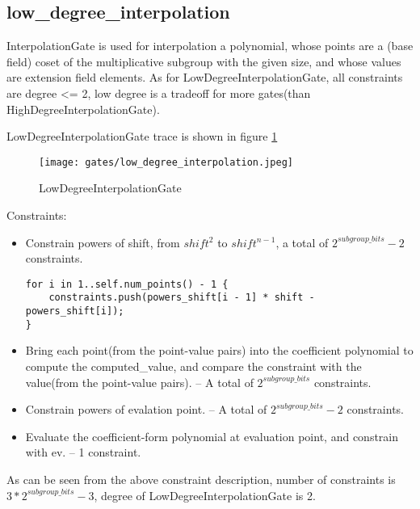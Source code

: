 \subsection{low\_degree\_interpolation}

InterpolationGate is used for interpolation a polynomial, whose points are a (base field) coset of the multiplicative subgroup 
with the given size, and whose values are extension field elements. As for LowDegreeInterpolationGate,  all constraints are degree <= 2, 
low degree is a tradeoff for more gates(than HighDegreeInterpolationGate).

LowDegreeInterpolationGate trace is shown in figure \ref{fig:low-degree-interpolation}

\begin{figure}[!ht]
    \centering
    \texttt{[image: gates/low\_degree\_interpolation.jpeg]}
    \caption{LowDegreeInterpolationGate}
    \label{fig:low-degree-interpolation}
\end{figure}

Constraints:
\begin{itemize}
    \item Constrain powers of shift, from $shift^2$ to $shift^{n-1}$, a total of $2^{subgroup\_bits}-2$ constraints.
    \begin{lstlisting}
for i in 1..self.num_points() - 1 {
    constraints.push(powers_shift[i - 1] * shift - powers_shift[i]);
}
    \end{lstlisting}
    \item Bring each point(from the point-value pairs) into the coefficient polynomial to compute the computed\_value, 
    and compare the constraint with the value(from the point-value pairs). -- A total of $2^{subgroup\_bits}$ constraints.
    \item Constrain powers of evalation point. -- A total of $2^{subgroup\_bits}-2$ constraints.
    \item Evaluate the coefficient-form polynomial at evaluation point, and constrain with ev. -- 1 constraint.
\end{itemize}

As can be seen from the above constraint description, number of constraints is $3*2^{subgroup\_bits}-3$, degree of LowDegreeInterpolationGate is 2.